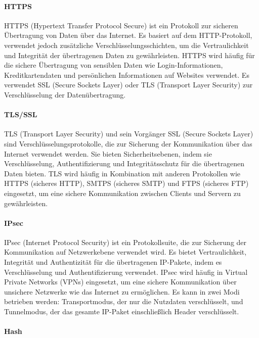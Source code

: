 \paragraph{HTTPS}

HTTPS (Hypertext Transfer Protocol Secure) ist ein Protokoll zur sicheren Übertragung von Daten über das Internet. Es basiert auf dem HTTP-Protokoll, verwendet jedoch zusätzliche Verschlüsselungsschichten, um die Vertraulichkeit und Integrität der übertragenen Daten zu gewährleisten. HTTPS wird häufig für die sichere Übertragung von sensiblen Daten wie Login-Informationen, Kreditkartendaten und persönlichen Informationen auf Websites verwendet. Es verwendet SSL (Secure Sockets Layer) oder TLS (Transport Layer Security) zur Verschlüsselung der Datenübertragung.

\paragraph{TLS/SSL}

TLS (Transport Layer Security) und sein Vorgänger SSL (Secure Sockets Layer) sind Verschlüsselungsprotokolle, die zur Sicherung der Kommunikation über das Internet verwendet werden. Sie bieten Sicherheitsebenen, indem sie Verschlüsselung, Authentifizierung und Integritätsschutz für die übertragenen Daten bieten. TLS wird häufig in Kombination mit anderen Protokollen wie HTTPS (sicheres HTTP), SMTPS (sicheres SMTP) und FTPS (sicheres FTP) eingesetzt, um eine sichere Kommunikation zwischen Clients und Servern zu gewährleisten.

\paragraph{IPsec}

IPsec (Internet Protocol Security) ist ein Protokollsuite, die zur Sicherung der Kommunikation auf Netzwerkebene verwendet wird. Es bietet Vertraulichkeit, Integrität und Authentizität für die übertragenen IP-Pakete, indem es Verschlüsselung und Authentifizierung verwendet. IPsec wird häufig in Virtual Private Networks (VPNs) eingesetzt, um eine sichere Kommunikation über unsichere Netzwerke wie das Internet zu ermöglichen. Es kann in zwei Modi betrieben werden: Transportmodus, der nur die Nutzdaten verschlüsselt, und Tunnelmodus, der das gesamte IP-Paket einschließlich Header verschlüsselt.

\paragraph{Hash}

